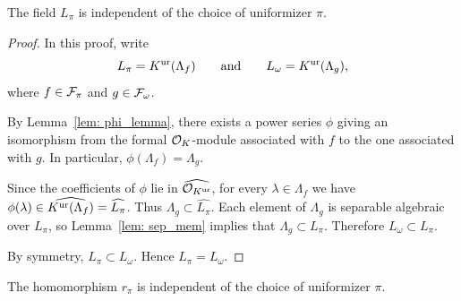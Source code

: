 \begin{theorem}
    The field $L_\pi$ is independent of the choice of uniformizer $\pi$.
\end{theorem}

\begin{proof}
    In this proof, write
    \[
        L_\pi=K^{\mathrm{ur}}(\Lambda_f)
        \qquad\text{and}\qquad
        L_\omega=K^{\mathrm{ur}}(\Lambda_g),
    \]
    where $f\in \mathcal{F}_\pi$ and $g\in \mathcal{F}_\omega$.

    By Lemma~\ref{lem: phi_lemma}, there exists a power series $\phi$ giving
    an isomorphism from the formal $\mathcal{O}_K$-module associated with $f$ to the
    one associated with $g$. In particular, $\phi(\Lambda_f)=\Lambda_g$.

    Since the coefficients of $\phi$ lie in $\widehat{\mathcal{O}_{K^{\mathrm{ur}}}}$, for every
    $\lambda\in \Lambda_f$ we have
    $\phi(\lambda)\in \widehat{K^{\mathrm{ur}}(\Lambda_f)}=\widehat{L_\pi}$. Thus
    $\Lambda_g\subset \widehat{L_\pi}$. Each element of $\Lambda_g$ is
    separable algebraic over $L_\pi$, so Lemma~\ref{lem: sep_mem} implies that
    $\Lambda_g\subset L_\pi$. Therefore $L_\omega\subset L_\pi$.

    By symmetry, $L_\pi\subset L_\omega$. Hence $L_\pi=L_\omega$.
\end{proof}

\begin{theorem}
    The homomorphism $r_\pi$ is independent of the choice of uniformizer
    $\pi$.
\end{theorem}

